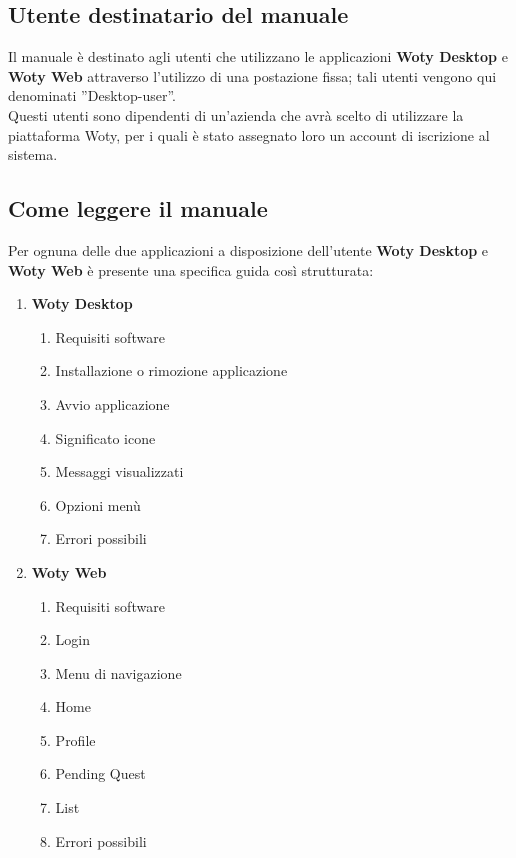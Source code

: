 \subsection{Utente destinatario del manuale}
Il manuale è destinato agli utenti che utilizzano le applicazioni \textbf{Woty Desktop} e \textbf{Woty Web} attraverso l'utilizzo di una postazione fissa; tali utenti vengono qui denominati ''Desktop-user''.\\
Questi utenti sono dipendenti di un'azienda che avrà scelto di utilizzare la piattaforma Woty, per i quali è stato assegnato loro un account di iscrizione al sistema.


\subsection{Come leggere il manuale}
	
Per ognuna delle due applicazioni a disposizione dell'utente \textbf{Woty Desktop} e \textbf{Woty Web} è presente una specifica guida così strutturata:

\begin{enumerate}
\item \textbf{Woty Desktop}

\begin{enumerate}
\item Requisiti software
\item Installazione o rimozione applicazione
\item Avvio applicazione
\item Significato icone
\item Messaggi visualizzati
\item Opzioni menù
\item Errori possibili
\end{enumerate}



\item \textbf{Woty Web}

\begin{enumerate}
\item Requisiti software
\item Login
\item Menu di navigazione
\item Home
\item Profile
\item Pending Quest
\item List
\item Errori possibili

\end{enumerate}

\end{enumerate}


